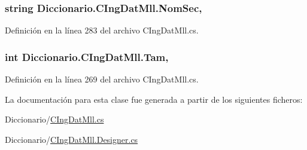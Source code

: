 \hypertarget{class_diccionario_1_1_c_ing_dat_mll_a32743a22e355f7605920f32741cb76cf}{
\subsubsection[{Nom\-Sec}]{\setlength{\rightskip}{0pt plus 5cm}string Diccionario.\-C\-Ing\-Dat\-Mll.\-Nom\-Sec\hspace{0.3cm}{\ttfamily [get]}, {\ttfamily [set]}}}\label{class_diccionario_1_1_c_ing_dat_mll_a32743a22e355f7605920f32741cb76cf}


Definición en la línea 283 del archivo C\-Ing\-Dat\-Mll.\-cs.

\hypertarget{class_diccionario_1_1_c_ing_dat_mll_a872c8df788279d9da07cdce5b4f77b4e}{
\subsubsection[{Tam}]{\setlength{\rightskip}{0pt plus 5cm}int Diccionario.\-C\-Ing\-Dat\-Mll.\-Tam\hspace{0.3cm}{\ttfamily [get]}, {\ttfamily [set]}}}\label{class_diccionario_1_1_c_ing_dat_mll_a872c8df788279d9da07cdce5b4f77b4e}


Definición en la línea 269 del archivo C\-Ing\-Dat\-Mll.\-cs.



La documentación para esta clase fue generada a partir de los siguientes ficheros\-:\begin{DoxyCompactItemize}
\item 
Diccionario/\hyperlink{_c_ing_dat_mll_8cs}{C\-Ing\-Dat\-Mll.\-cs}\item 
Diccionario/\hyperlink{_c_ing_dat_mll_8_designer_8cs}{C\-Ing\-Dat\-Mll.\-Designer.\-cs}\end{DoxyCompactItemize}
